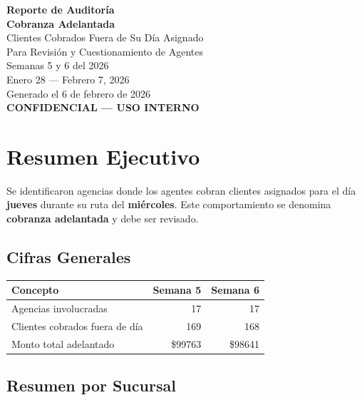 \documentclass[11pt,a4paper]{article}
\newcommand{\money}[1]{\$\num{#1}}
\begin{document}
\thispagestyle{empty}
\vspace*{3cm}
\begin{center}
  {\Huge\bfseries\color{xpressblue} Reporte de Auditor\'ia}\\[0.5cm]
  {\Huge\bfseries\color{xpressblue} Cobranza Adelantada}\\[1.5cm]
  {\Large\color{xpressgray} Clientes Cobrados Fuera de Su D\'ia Asignado}\\[0.5cm]
  {\Large\color{xpressgray} Para Revisi\'on y Cuestionamiento de Agentes}\\[2.5cm]
  {\large Semanas 5 y 6 del 2026}\\[0.3cm]
  {\large Enero 28 --- Febrero 7, 2026}\\[3cm]
  {\normalsize\color{xpressgray} Generado el 6 de febrero de 2026}\\[0.3cm]
  {\normalsize\color{alertred}\bfseries CONFIDENCIAL --- USO INTERNO}
\end{center}
\newpage

\tableofcontents
\newpage

\section{Resumen Ejecutivo}

Se identificaron agencias donde los agentes cobran clientes asignados para el d\'ia
\textbf{jueves} durante su ruta del \textbf{mi\'ercoles}. Este comportamiento se
denomina \textbf{cobranza adelantada} y debe ser revisado.

\subsection{Cifras Generales}

\begin{center}
\renewcommand{\arraystretch}{1.4}
\begin{tabular}{lrr}
\toprule
\textbf{Concepto} & \textbf{Semana 5} & \textbf{Semana 6} \\
\midrule
Agencias involucradas & 17 & 17 \\
Clientes cobrados fuera de d\'ia & 169 & 168 \\
Monto total adelantado & \money{99763} & \money{98641} \\

\bottomrule
\end{tabular}
\end{center}

\subsection{Resumen por Sucursal}
\end{document}
